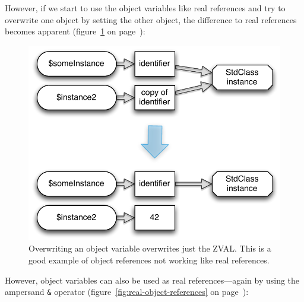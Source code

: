 However, if we start to use the object variables like real references and try to overwrite one object by setting the other object, the difference to real references becomes apparent (figure~\ref{fig:false-object-references} on page~\pageref{fig:false-object-references}):



\begin{figure}[htb]
  \begin{center}
    \includegraphics[scale=0.8]{images/someInstance_instance2}
    \caption{Overwriting an object variable overwrites just the ZVAL. This is a good example of object references not working like real references.}
    \label{fig:false-object-references}
  \end{center}
\end{figure}

However, object variables can also be used as real references---again by using the ampersand \texttt{\&} operator (figure~\ref{fig:real-object-references} on page~\pageref{fig:real-object-references}):

